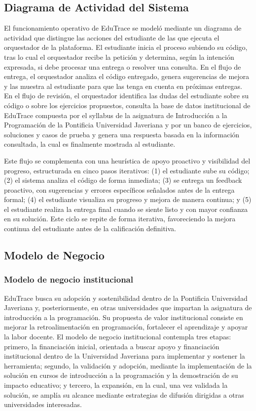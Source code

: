 \documentclass[letterpaper, 10 pt, conference]{ieeeconf}
\begin{document}
\subsection{Diagrama de Actividad del Sistema}
El funcionamiento operativo de EduTrace se modeló mediante un diagrama de actividad que distingue las acciones del estudiante de las que ejecuta el orquestador de la plataforma. El estudiante inicia el proceso subiendo su código, tras lo cual el orquestador recibe la petición y determina, según la intención expresada, si debe procesar una entrega o resolver una consulta. En el flujo de entrega, el orquestador analiza el código entregado, genera sugerencias de mejora y las muestra al estudiante para que las tenga en cuenta en próximas entregas. En el flujo de revisión, el orquestador identifica las dudas del estudiante sobre su código o sobre los ejercicios propuestos, consulta la base de datos institucional de EduTrace compuesta por el syllabus de la asignatura de Introducción a la Programación de la Pontificia Universidad Javeriana y por un banco de ejercicios, soluciones y casos de prueba y genera una respuesta basada en la información consultada, la cual es finalmente mostrada al estudiante.

Este flujo se complementa con una heurística de apoyo proactivo y visibilidad del progreso, estructurada en cinco pasos iterativos: (1) el estudiante sube su código; (2) el sistema analiza el código de forma inmediata; (3) se entrega un feedback proactivo, con sugerencias y errores específicos señalados antes de la entrega formal; (4) el estudiante visualiza su progreso y mejora de manera continua; y (5) el estudiante realiza la entrega final cuando se siente listo y con mayor confianza en su solución. Este ciclo se repite de forma iterativa, favoreciendo la mejora continua del estudiante antes de la calificación definitiva.

\subsection{Modelo de Negocio}

\subsubsection{Modelo de negocio institucional}
EduTrace busca su adopción y sostenibilidad dentro de la Pontificia Universidad Javeriana y, posteriormente, en otras universidades que impartan la asignatura de introducción a la programación. Su propuesta de valor institucional consiste en mejorar la retroalimentación en programación, fortalecer el aprendizaje y apoyar la labor docente. El modelo de negocio institucional contempla tres etapas: primero, la financiación inicial, orientada a buscar apoyo y financiación institucional dentro de la Universidad Javeriana para implementar y sostener la herramienta; segundo, la validación y adopción, mediante la implementación de la solución en cursos de introducción a la programación y la demostración de su impacto educativo; y tercero, la expansión, en la cual, una vez validada la solución, se amplía su alcance mediante estrategias de difusión dirigidas a otras universidades interesadas.
\end{document}
